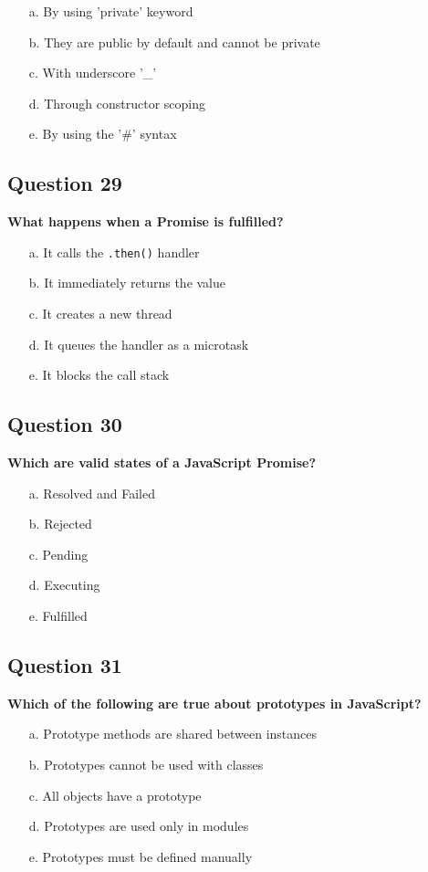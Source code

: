\documentclass{article}
\begin{document}
\begin{itemize}
  \item[a.] By using 'private' keyword
  \item[b.] They are public by default and cannot be private
  \item[c.] With underscore '\_'
  \item[d.] Through constructor scoping
  \item[e.] By using the '\#' syntax
\end{itemize}

\subsection*{Question 29}
\textbf{What happens when a Promise is fulfilled?}

\begin{itemize}
  \item[a.] It calls the \texttt{.then()} handler
  \item[b.] It immediately returns the value
  \item[c.] It creates a new thread
  \item[d.] It queues the handler as a microtask
  \item[e.] It blocks the call stack
\end{itemize}

\subsection*{Question 30}
\textbf{Which are valid states of a JavaScript Promise?}

\begin{itemize}
  \item[a.] Resolved and Failed
  \item[b.] Rejected
  \item[c.] Pending
  \item[d.] Executing
  \item[e.] Fulfilled
\end{itemize}

\subsection*{Question 31}
\textbf{Which of the following are true about prototypes in JavaScript?}

\begin{itemize}
  \item[a.] Prototype methods are shared between instances
  \item[b.] Prototypes cannot be used with classes
  \item[c.] All objects have a prototype
  \item[d.] Prototypes are used only in modules
  \item[e.] Prototypes must be defined manually
\end{itemize}
\end{document}
